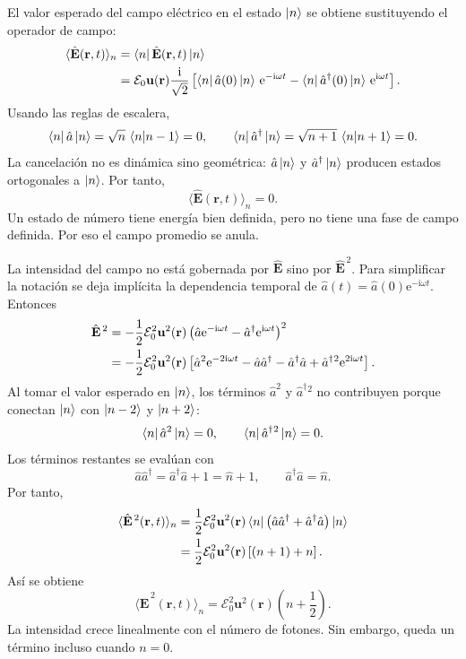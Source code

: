 \documentclass[11pt]{article}
\newcommand{\ii}{\mathrm{i}}
\newcommand{\ee}{\mathrm{e}}
\newcommand{\vb}[1]{\mathbf{#1}}
\newcommand{\adag}{\hat a^\dagger}
\newcommand{\Ezero}{\mathcal E_0}
\begin{document}
El valor esperado del campo el\'ectrico en el estado $\ket n$ se obtiene
sustituyendo el operador de campo:
\begin{align}
  \langle \hat{\vb E}(\vb r,t)\rangle_n
  &=
  \bra n \hat{\vb E}(\vb r,t)\ket n \notag\\
  &=
  \Ezero\vb u(\vb r)\frac{\ii}{\sqrt2}
  \left[
    \bra n\hat a(0)\ket n\,\ee^{-\ii\omega t}
    -
    \bra n\adag(0)\ket n\,\ee^{\ii\omega t}
  \right].
\end{align}
Usando las reglas de escalera,
\begin{equation}
  \bra n\hat a\ket n
  =
  \sqrt n\,\braket{n|n-1}
  =
  0,
  \qquad
  \bra n\adag\ket n
  =
  \sqrt{n+1}\,\braket{n|n+1}
  =
  0.
\end{equation}
La cancelaci\'on no es din\'amica sino geom\'etrica: $\hat a\ket n$ y
$\adag\ket n$ producen estados ortogonales a $\ket n$. Por tanto,
\begin{equation}
  \boxed{\langle \hat{\vb E}(\vb r,t)\rangle_n=0.}
\end{equation}
Un estado de n\'umero tiene energ\'ia bien definida, pero no tiene una fase de
campo definida. Por eso el campo promedio se anula.

La intensidad del campo no est\'a gobernada por $\hat{\vb E}$ sino por
$\hat{\vb E}^{\,2}$. Para simplificar la notaci\'on se deja impl\'icita la
dependencia temporal de $\hat a(t)=\hat a(0)\ee^{-\ii\omega t}$. Entonces
\begin{align}
  \hat{\vb E}^{\,2}
  &=
  -\frac12 \Ezero^2\vb u^2(\vb r)
  \left(\hat a\ee^{-\ii\omega t}
  -
  \adag\ee^{\ii\omega t}\right)^2 \notag\\
  &=
  -\frac12 \Ezero^2\vb u^2(\vb r)
  \left[
    \hat a^2\ee^{-2\ii\omega t}
    -
    \hat a\adag
    -
    \adag\hat a
    +
    \adag{}^2\ee^{2\ii\omega t}
  \right].
\end{align}
Al tomar el valor esperado en $\ket n$, los t\'erminos $\hat a^2$ y
$\adag{}^2$ no contribuyen porque conectan $\ket n$ con $\ket{n-2}$ y
$\ket{n+2}$:
\begin{equation}
  \bra n \hat a^2\ket n=0,
  \qquad
  \bra n \adag{}^2\ket n=0.
\end{equation}
Los t\'erminos restantes se eval\'uan con
\begin{equation}
  \hat a\adag=\adag\hat a+1=\hat n+1,
  \qquad
  \adag\hat a=\hat n.
\end{equation}
Por tanto,
\begin{align}
  \langle \hat{\vb E}^{\,2}(\vb r,t)\rangle_n
  &=
  \frac12 \Ezero^2\vb u^2(\vb r)
  \bra n
  \left(\hat a\adag+\adag\hat a\right)
  \ket n \notag\\
  &=
  \frac12 \Ezero^2\vb u^2(\vb r)
  \left[(n+1)+n\right].
\end{align}
As\'i se obtiene
\begin{equation}
  \boxed{
  \langle \hat{\vb E}^{\,2}(\vb r,t)\rangle_n
  =
  \Ezero^2\vb u^2(\vb r)\left(n+\frac12\right).
  }
\end{equation}
La intensidad crece linealmente con el n\'umero de fotones. Sin embargo,
queda un t\'ermino incluso cuando $n=0$.
\end{document}
